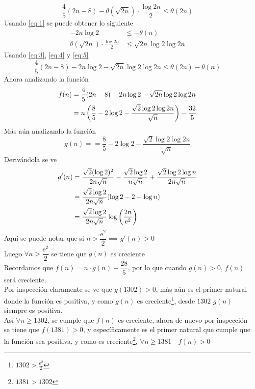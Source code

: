 \begin{sol}
\begin{equation}
		\frac45(2n-8)-\theta(\sqrt{2n})\cdot\frac{\log2n}{2}\leq\theta(2n)\label{eq:3}
	\end{equation}
	Usando \eqref{eq:1} se puede obtener lo siguiente
	\begin{align}
		-2n\log2                               & \leq-\theta(n)\label{eq:4}           \\
		\theta(\sqrt{2n})\cdot\frac{\log2n}{2} & \leq\sqrt{2n}\log2\log2n\label{eq:5}
	\end{align}
	Usando \eqref{eq:3}, \eqref{eq:4} y \eqref{eq:5}
	\begin{equation*}
		\frac45(2n-8)-2n\log2-\sqrt{2n}\log2\log2n\leq\theta(2n)-\theta(n)
	\end{equation*}
	Ahora analizando la función
	\begin{align*}
		f(n) & =\frac45(2n-8)-2n\log2-\sqrt{2n}\log2\log2n                            \\
		     & =n\left(\frac85-2\log2-\frac{\sqrt2\log2\log2n}{\sqrt{n}}\right)-\frac{32}5
	\end{align*}
	Más aún analizando la función
	\[g(n)==\frac85-2\log2-\frac{\sqrt2\log2\log2n}{\sqrt{n}}\]
	Derivándola se ve
	\begin{align*}
		g'(n) & =\frac{\sqrt2(\log2)^2}{2n\sqrt{n}}-\frac{\sqrt2\log2}{n\sqrt{n}}+\frac{\sqrt2\log2\log n}{2n\sqrt{n}} \\
		      & =\frac{\sqrt2\log2}{2n\sqrt{n}}(\log2-2-\log{n})                                                       \\
		      & =\frac{\sqrt2\log2}{2n\sqrt{n}}\log\left(\frac{2n}{\mathrm{e}^2}\right)
	\end{align*}
	Aquí se puede notar que si $n>\dfrac{\mathrm{e}^2}2\implies g'(n)>0$\\
	Luego $\forall n>\dfrac{\mathrm{e}^2}2$ se tiene que $g(n)$ es creciente\\
	Recordamos que $f(n)=n\cdot g(n)-\dfrac{28}5$, por lo que cuando $g(n)>0$, $f(n)$ será creciente.\\
	Por inspección claramente se ve que $g(1302)>0$, más aún es el primer natural donde la función es positiva, y como $g(n)$ es creciente\footnote{$1302>\frac{\mathrm{e}^2}2$}, desde $1302$ $g(n)$ siempre es positiva.\\
	Así $\forall n\geq1302$, se cumple que $f(n)$ es creciente, ahora de nuevo por inspección se tiene que $f(1381)>0$, y específicamente es el primer natural que cumple que la función sea positiva, y como es creciente\footnote{$1381>1302$}, $\forall n\geq1381\quad f(n)>0$\\

\end{sol}

